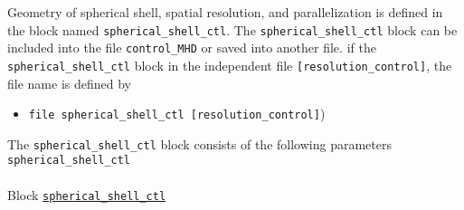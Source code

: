 Geometry of spherical shell, spatial resolution, and parallelization is defined in the block named \verb|spherical_shell_ctl|. The \verb|spherical_shell_ctl| block can be included into the file {\tt control\_MHD} or saved into another file.  if the \verb|spherical_shell_ctl| block in the independent file {\tt [resolution\_control]}, the file name is defined by
%
\begin{itemize}
\item {\tt   file    spherical\_shell\_ctl        [resolution\_control]})
\end{itemize}
The \verb|spherical_shell_ctl| block consists of the following parameters
%
\verb|spherical_shell_ctl|
\label{href_i:spherical_shell_ctl}
\\
\\
%
Block \hyperref[href_t:spherical_shell_ctl]{\tt spherical\_shell\_ctl}
%
